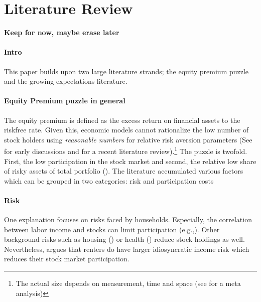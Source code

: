\documentclass[ProjectABM]{subfiles}
\begin{document}

\section{Literature Review}\label{sec:literature}
\textbf{Keep for now, maybe erase later}

\paragraph{Intro}
This paper builds upon two large literature strands; the equity premium puzzle and the growing expectations literature.

\paragraph{Equity Premium puzzle in general}
The equity premium is defined as the excess return on financial assets to the riskfree rate. Given this, economic models cannot rationalize the low number of stock holders using \textit{reasonable numbers} for relative risk aversion parameters (See \cite{mehra_porescott_1985equity_premium, haliassos_bertraut_1995equity_premium} for early discussions and \cite{Gomes_et_al_2021} for a recent literature review).\footnote{ The actual size depends on measurement, time and space (see\cite{vanEwijk_et_al_2012meta_equity_premium} for a meta analysis)} The puzzle is twofold. First, the low participation in the stock market and second, the relative low share of risky assets of total portfolio (\cite{campbell_2006household_finance}). The literature accumulated various factors which can be grouped in two categories: risk and participation costs %

\paragraph{Risk}
One explanation focuses on risks faced by households. Especially, the correlation between labor income and stocks can limit participation (e.g.,\cite{BCG2007stocklabor}). Other background risks such as housing (\cite{cocco2005housing}) or health (\cite{GJT1996_health}) reduce stock holdings as well. Nevertheless, \cite{catherine2020_countercyclical} argues that renters do have larger idiosyncratic income risk which reduces their stock market participation.%
\end{document}
